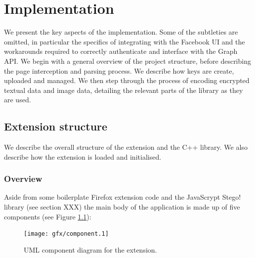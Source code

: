 \chapter{Implementation}\label{ch:implementation}

We present the key aspects of the implementation. Some of the subtleties are omitted, in particular the specifics of integrating with the Facebook UI and the workarounds required to correctly authenticate and interface with the Graph API. We begin with a general overview of the project structure, before describing the page interception and parsing process. We describe how keys are create, uploaded and managed. We then step through the process of encoding encrypted textual data and image data, detailing the relevant parts of the library as they are used. 


\FloatBarrier
\section{Extension structure}

We describe the overall structure of the extension and the C++ library. We also describe how the extension is loaded and initialised.

\subsection{Overview}

    Aside from some boilerplate Firefox extension code and the JavaScrypt Stego! library (see section XXX) the main body of the application is made up of five components (see Figure \ref{uml:component}):

    \begin{figure}[tb]
        \begin{center}
                \texttt{[image: gfx/component.1]}
            \caption{UML component diagram for the extension.}
            \label{uml:component}
        \end{center}
    \end{figure}
    
